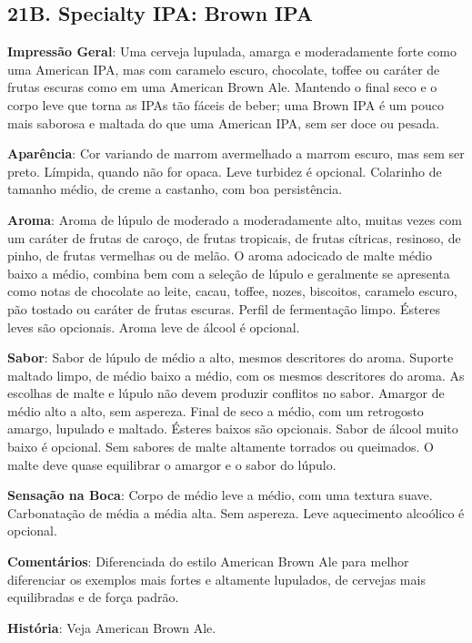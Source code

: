 \subsection*{21B. Specialty IPA: Brown IPA}

\textbf{Impressão Geral}: Uma cerveja lupulada, amarga e moderadamente forte como uma American IPA, mas com caramelo escuro, chocolate, toffee ou caráter de frutas escuras como em uma American Brown Ale. Mantendo o final seco e o corpo leve que torna as IPAs tão fáceis de beber; uma Brown IPA é um pouco mais saborosa e maltada do que uma American IPA, sem ser doce ou pesada.

\textbf{Aparência}: Cor variando de marrom avermelhado a marrom escuro, mas sem ser preto. Límpida, quando não for opaca. Leve turbidez é opcional. Colarinho de tamanho médio, de creme a castanho, com boa persistência.

\textbf{Aroma}: Aroma de lúpulo de moderado a moderadamente alto, muitas vezes com um caráter de frutas de caroço, de frutas tropicais, de frutas cítricas, resinoso, de pinho, de frutas vermelhas ou de melão. O aroma adocicado de malte médio baixo a médio, combina bem com a seleção de lúpulo e geralmente se apresenta como notas de chocolate ao leite, cacau, toffee, nozes, biscoitos, caramelo escuro, pão tostado ou caráter de frutas escuras. Perfil de fermentação limpo. Ésteres leves são opcionais. Aroma leve de álcool é opcional.

\textbf{Sabor}: Sabor de lúpulo de médio a alto, mesmos descritores do aroma. Suporte maltado limpo, de médio baixo a médio, com os mesmos descritores do aroma. As escolhas de malte e lúpulo não devem produzir conflitos no sabor. Amargor de médio alto a alto, sem aspereza. Final de seco a médio, com um retrogosto amargo, lupulado e maltado. Ésteres baixos são opcionais. Sabor de álcool muito baixo é opcional. Sem sabores de malte altamente torrados ou queimados. O malte deve quase equilibrar o amargor e o sabor do lúpulo.

\textbf{Sensação na Boca}: Corpo de médio leve a médio, com uma textura suave. Carbonatação de média a média alta. Sem aspereza. Leve aquecimento alcoólico é opcional.

\textbf{Comentários}: Diferenciada do estilo American Brown Ale para melhor diferenciar os exemplos mais fortes e altamente lupulados, de cervejas mais equilibradas e de força padrão.

\textbf{História}: Veja American Brown Ale.


